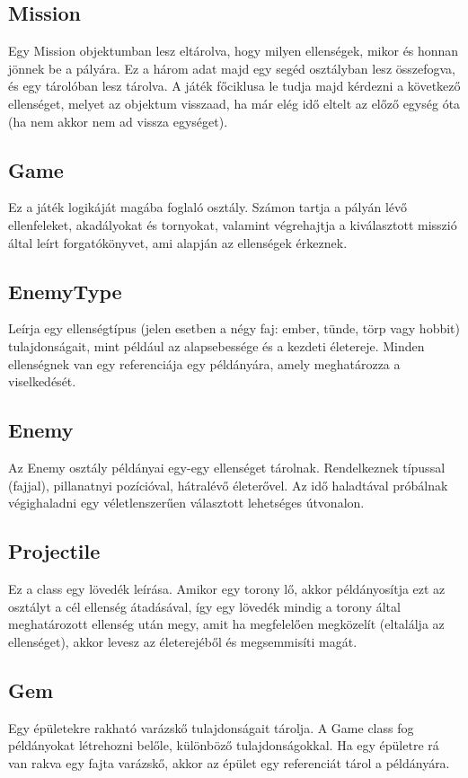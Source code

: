 \subsection{Mission}
Egy Mission objektumban lesz eltárolva, hogy milyen ellenségek, mikor és honnan jönnek be a pályára. Ez a három adat majd egy segéd osztályban lesz összefogva, és egy tárolóban lesz tárolva. A játék főciklusa le tudja majd kérdezni a következő ellenséget, melyet az objektum visszaad, ha már elég idő eltelt az előző egység óta (ha nem akkor nem ad vissza egységet).

\subsection{Game}
Ez a játék logikáját magába foglaló osztály. Számon tartja a pályán lévő ellenfeleket, akadályokat és tornyokat, valamint végrehajtja a kiválasztott misszió által leírt forgatókönyvet, ami alapján az ellenségek érkeznek.

\subsection{EnemyType}
Leírja egy ellenségtípus (jelen esetben a négy faj: ember, tünde, törp vagy hobbit) tulajdonságait, mint például az alapsebessége és a kezdeti életereje. Minden ellenségnek van egy referenciája egy példányára, amely meghatározza a viselkedését.

\subsection{Enemy}
Az Enemy osztály példányai egy-egy ellenséget tárolnak. Rendelkeznek típussal (fajjal), pillanatnyi pozícióval, hátralévő életerővel. Az idő haladtával próbálnak végighaladni egy véletlenszerűen választott lehetséges útvonalon.

\subsection{Projectile}
Ez a class egy lövedék leírása. Amikor egy torony lő, akkor példányosítja ezt az osztályt a cél ellenség átadásával, így egy lövedék mindig a torony által meghatározott ellenség után megy, amit ha megfelelően megközelít (eltalálja az ellenséget), akkor levesz az életerejéből és megsemmisíti magát.

\subsection{Gem}
Egy épületekre rakható varázskő tulajdonságait tárolja. A Game class fog példányokat létrehozni belőle, különböző tulajdonságokkal. Ha egy épületre rá van rakva egy fajta varázskő, akkor az épület egy referenciát tárol a példányára.


